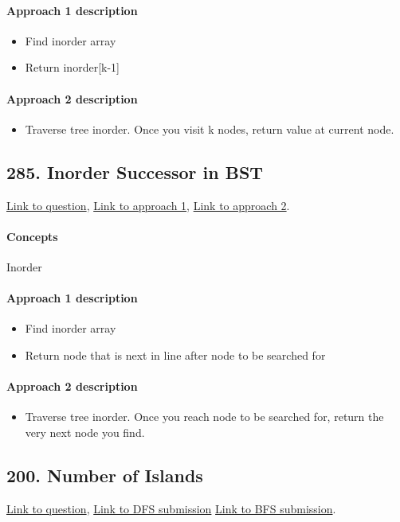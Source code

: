 \documentclass[11pt]{book}
\begin{document}
\paragraph{Approach 1 description}
\begin{itemize}
    \item Find inorder array
    \item Return inorder[k-1]
\end{itemize}
\paragraph{Approach 2 description}
\begin{itemize}
    \item Traverse tree inorder. Once you visit k nodes, return value at current node.
\end{itemize}

\subsection{285. Inorder Successor in BST}
\href{https://leetcode.com/problems/inorder-successor-in-bst/}{Link to question},
\href{https://leetcode.com/submissions/detail/329750456/}{Link to approach 1},
\href{https://leetcode.com/submissions/detail/338358126/}{Link to approach 2}.
\paragraph{Concepts}
Inorder
\paragraph{Approach 1 description}
\begin{itemize}
    \item Find inorder array
    \item Return node that is next in line after node to be searched for
\end{itemize}
\paragraph{Approach 2 description}
\begin{itemize}
    \item Traverse tree inorder. Once you reach node to be searched for, return the very next node you find.
\end{itemize}

\subsection{200. Number of Islands}
\href{https://leetcode.com/problems/number-of-islands/}{Link to question},
\href{https://leetcode.com/submissions/detail/338367817/}{Link to DFS submission}
\href{https://leetcode.com/submissions/detail/330130757/}{Link to BFS submission}.
\end{document}
